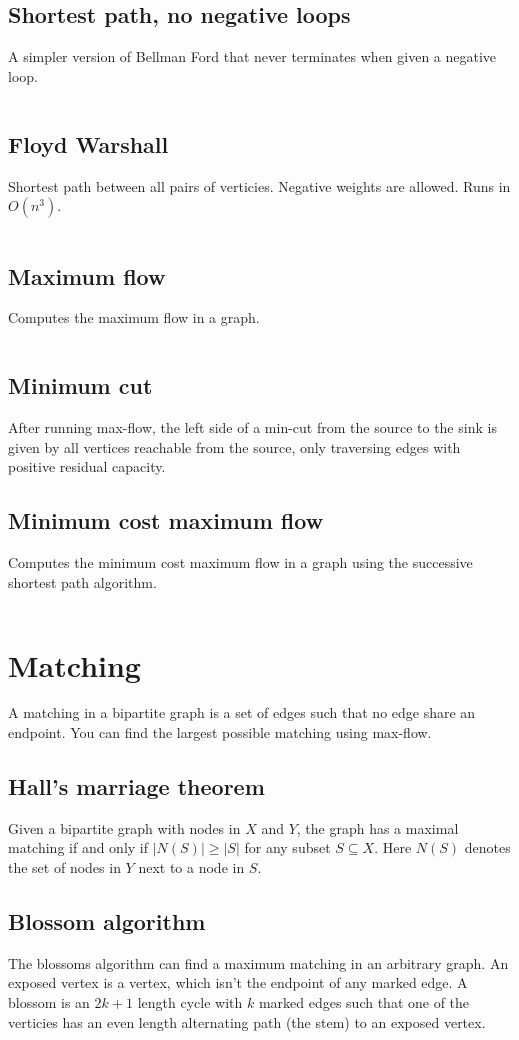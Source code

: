 \documentclass[10pt,a4paper,landscape,oneside]{amsart}
\newcommand{\code}[1]{\inputminted[fontsize=\large,tabsize=2,baselinestretch=1]{java}{#1}}
\begin{document}
\begin{multicols*}{2}
\subsection{Shortest path, no negative loops}
A simpler version of Bellman Ford that never terminates when given a negative loop.
\code{graph/shortest-path-noloop.java}
\subsection{Floyd Warshall}
Shortest path between all pairs of verticies. Negative weights are allowed. Runs in
\(O(n^3)\).
\code{graph/floyd-warshall.java}
\subsection{Maximum flow}
Computes the maximum flow in a graph.
\code{graph/max-flow.java}
\subsection{Minimum cut}
After running max-flow, the left side of a min-cut from the source to the sink is given
by all vertices reachable from the source, only traversing edges with positive residual
capacity.
\subsection{Minimum cost maximum flow}
Computes the minimum cost maximum flow in a graph using the successive shortest path
algorithm.
\code{graph/min-cost-max-flow.java}

\section{Matching}
A matching in a bipartite graph is a set of edges such that no edge share an endpoint.
You can find the largest possible matching using max-flow.
\subsection{Hall's marriage theorem}
Given a bipartite graph with nodes in \(X\) and \(Y\), the graph has a maximal matching
if and only if \(|N(S)| \geq |S|\) for any subset \(S \subseteq X\). Here \(N(S)\)
denotes the set of nodes in \(Y\) next to a node in \(S\).
\subsection{Blossom algorithm}
The blossoms algorithm can find a maximum matching in an arbitrary graph. An exposed
vertex is a vertex, which isn't the endpoint of any marked edge. A blossom is an
\(2k+1\) length cycle with \(k\) marked edges such that one of the verticies has an even
length alternating path (the stem) to an exposed vertex.


\end{multicols*}
\end{document}
